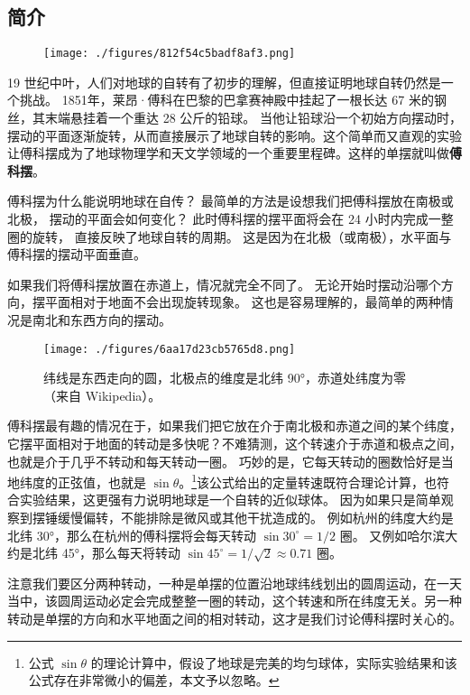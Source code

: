 
\subsection{简介}

\begin{figure}[ht]
\centering
\texttt{[image: ./figures/812f54c5badf8af3.png]}
\caption{} \label{fig_FouPen_1}
\end{figure}

19 世纪中叶，人们对地球的自转有了初步的理解，但直接证明地球自转仍然是一个挑战。 1851年，莱昂·傅科在巴黎的巴拿赛神殿中挂起了一根长达 67 米的钢丝，其末端悬挂着一个重达 28 公斤的铅球。 当他让铅球沿一个初始方向摆动时，摆动的平面逐渐旋转，从而直接展示了地球自转的影响。这个简单而又直观的实验让傅科摆成为了地球物理学和天文学领域的一个重要里程碑。这样的单摆就叫做\textbf{傅科摆}。

傅科摆为什么能说明地球在自传？ 最简单的方法是设想我们把傅科摆放在南极或北极， 摆动的平面会如何变化？ 此时傅科摆的摆平面将会在 24 小时内完成一整圈的旋转， 直接反映了地球自转的周期。 这是因为在北极（或南极），水平面与傅科摆的摆动平面垂直。

如果我们将傅科摆放置在赤道上，情况就完全不同了。 无论开始时摆动沿哪个方向，摆平面相对于地面不会出现旋转现象。 这也是容易理解的，最简单的两种情况是南北和东西方向的摆动。

\begin{figure}[ht]
\centering
\texttt{[image: ./figures/6aa17d23cb5765d8.png]}
\caption{纬线是东西走向的圆，北极点的维度是北纬 90°，赤道处纬度为零（来自 Wikipedia）。} \label{fig_FouPen_3}
\end{figure}


傅科摆最有趣的情况在于，如果我们把它放在介于南北极和赤道之间的某个纬度，它摆平面相对于地面的转动是多快呢？不难猜测，这个转速介于赤道和极点之间，也就是介于几乎不转动和每天转动一圈。 巧妙的是，它每天转动的圈数恰好是当地纬度的正弦值，也就是 $\sin\theta$。\footnote{公式 $\sin\theta$ 的理论计算中，假设了地球是完美的均匀球体，实际实验结果和该公式存在非常微小的偏差，本文予以忽略。}该公式给出的定量转速既符合理论计算，也符合实验结果，这更强有力说明地球是一个自转的近似球体。 因为如果只是简单观察到摆锤缓慢偏转，不能排除是微风或其他干扰造成的。 例如杭州的纬度大约是北纬 30°，那么在杭州的傅科摆将会每天转动 $\sin 30^\circ = 1/2$ 圈。 又例如哈尔滨大约是北纬 45°，那么每天将转动 $\sin 45^\circ = 1/\sqrt{2}\approx 0.71$ 圈。

注意我们要区分两种转动，一种是单摆的位置沿地球纬线划出的圆周运动，在一天当中，该圆周运动必定会完成整整一圈的转动，这个转速和所在纬度无关。另一种转动是单摆的方向和水平地面之间的相对转动，这才是我们讨论傅科摆时关心的。


